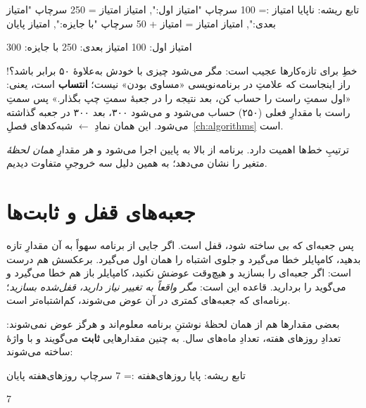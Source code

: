 \begin{salamfa}
تابع ریشه:
    ناپایا امتیاز := 100
    سرچاپ "امتیاز اول:", امتیاز
    امتیاز = 250
    سرچاپ "امتیاز بعدی:", امتیاز
    امتیاز = امتیاز + 50
    سرچاپ "با جایزه:", امتیاز
پایان
\end{salamfa}

\begin{progoutfa}
امتیاز اول: 100
امتیاز بعدی: 250
با جایزه: 300
\end{progoutfa}

خطِ  برای تازه‌کارها عجیب است: مگر می‌شود چیزی
با خودش به‌علاوهٔ ۵۰ برابر باشد؟! راز اینجاست که علامتِ \code{=} در
برنامه‌نویسی «مساوی بودن» نیست؛ \textbf{انتساب} است، یعنی: «اول سمتِ راست
را حساب کن، بعد نتیجه را در جعبهٔ سمتِ چپ بگذار.» پس سمتِ راست با مقدارِ
فعلی (۲۵۰) حساب می‌شود و می‌شود ۳۰۰، بعد ۳۰۰ در جعبه گذاشته می‌شود. این
همان نمادِ $\leftarrow$ شبه‌کدهای فصلِ~\ref{ch:algorithms} است.

\begin{note}
ترتیبِ خط‌ها اهمیت دارد. برنامه از بالا به پایین اجرا می‌شود و هر
 مقدارِ \emph{همان لحظهٔ} متغیر را نشان می‌دهد؛ به همین دلیل سه
خروجیِ متفاوت دیدیم.
\end{note}

\section{جعبه‌های قفل و ثابت‌ها}

پس جعبه‌ای که بی‌ ساخته شود، قفل است. اگر جایی از برنامه سهواً
به آن مقدارِ تازه بدهید، کامپایلر خطا می‌گیرد و جلوی اشتباه را همان اول
می‌گیرد. برعکسش هم درست است: اگر جعبه‌ای را  بسازید و هیچ‌وقت
عوضش نکنید، کامپایلر باز هم خطا می‌گیرد و می‌گوید  را بردارید.
قاعده این است: \emph{مگر واقعاً به تغییر نیاز دارید، قفل‌شده بسازید}؛
برنامه‌ای که جعبه‌های کمتری در آن عوض می‌شوند، کم‌اشتباه‌تر است.

بعضی مقدارها هم از همان لحظهٔ نوشتنِ برنامه معلوم‌اند و هرگز عوض نمی‌شوند:
تعدادِ روزهای هفته، تعدادِ ماه‌های سال. به چنین مقدارهایی \textbf{ثابت}
می‌گویند و با واژهٔ  ساخته می‌شوند:

\begin{salamfa}
تابع ریشه:
    پایا روزهای‌هفته := 7
    سرچاپ روزهای‌هفته
پایان
\end{salamfa}

\begin{progout}
7
\end{progout}

